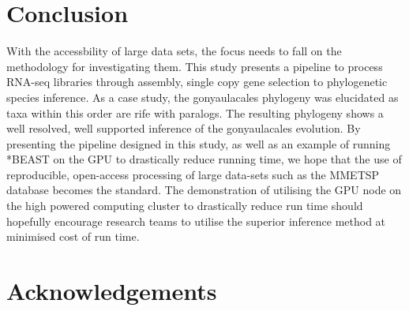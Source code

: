 \documentclass[12pt]{article}
\begin{document}
\section{Conclusion}
With the accessbility of large data sets, the focus needs to fall on the methodology for investigating them. This study presents a pipeline to process RNA-seq libraries through assembly, single copy gene selection to phylogenetic species inference. As a case study, the gonyaulacales phylogeny was elucidated as taxa within this order are rife with paralogs. The resulting phylogeny shows a well resolved, well supported inference of the gonyaulacales evolution. By presenting the pipeline designed in this study, as well as an example of running *BEAST on the GPU to drastically reduce running time, we hope that the use of reproducible, open-access processing of large data-sets such as the MMETSP database becomes the standard. The demonstration of utilising the GPU node on the high powered computing cluster to drastically reduce run time should hopefully encourage research teams to utilise the superior inference method at minimised cost of run time. 
\newpage

\section{Acknowledgements}


\end{document}

